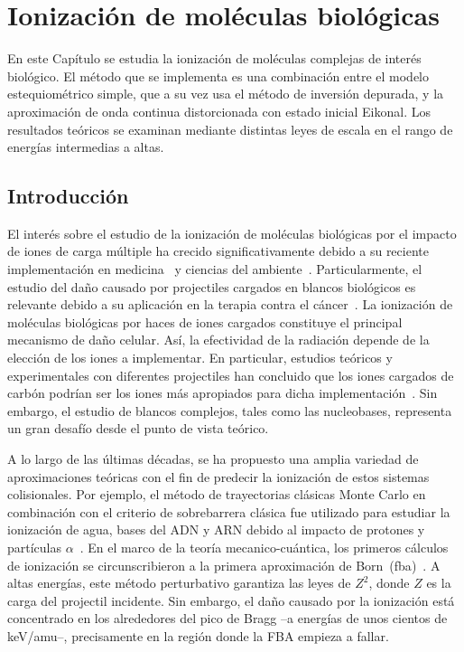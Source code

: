 \chapter{Ionización de moléculas biológicas}
\label{chap:ionmol}

En este Capítulo se estudia la ionización de moléculas complejas de 
interés biológico. El método que se implementa es una combinación entre 
el modelo estequiométrico simple, que a su vez usa el método de 
inversión depurada, y la aproximación de onda continua distorcionada con 
estado inicial Eikonal. Los resultados teóricos se examinan mediante 
distintas leyes de escala en el rango de energías intermedias a altas. 

\section{Introducción}

El interés sobre el estudio de la ionización de moléculas biológicas por 
el impacto de iones de carga múltiple ha crecido significativamente 
debido a su reciente implementación en medicina~\cite{Baskar:12,Solov:09} 
y ciencias del ambiente~\cite{Gafur:18,FerrazDias:13}. Particularmente, 
el estudio del daño causado por projectiles cargados en blancos 
biológicos es relevante debido a su aplicación en la terapia contra el 
cáncer~\cite{Baskar:12}. La ionización de moléculas biológicas por haces 
de iones cargados constituye el principal mecanismo de daño celular. 
Así, la efectividad de la radiación depende de la elección de los iones 
a implementar. En particular, estudios teóricos y experimentales con 
diferentes projectiles han concluido que los iones cargados de carbón 
podrían ser los iones más apropiados para dicha 
implementación~\cite{Mohamad:17}. Sin embargo, el estudio de blancos 
complejos, tales como las nucleobases, representa un gran desafío desde 
el punto de vista teórico. 

A lo largo de las últimas décadas, se ha propuesto una amplia variedad 
de aproximaciones teóricas con el fin de predecir la ionización de estos 
sistemas colisionales. Por ejemplo, el método de trayectorias clásicas 
Monte Carlo en combinación con el criterio de sobrebarrera clásica fue 
utilizado para estudiar la ionización de agua, bases del ADN y ARN 
debido al impacto de protones y partículas 
$\alpha$~\cite{Abbas:08,Lekadir:09}. 
En el marco de la teoría mecanico-cuántica, los primeros cálculos de 
ionización se circunscribieron a la primera aproximación de 
Born~(\acs{fba})~\cite{DalCappello:08,Champion:10}. A altas energías, 
este método perturbativo garantiza las leyes de $Z^2$, donde $Z$ es la 
carga del projectil incidente. Sin embargo, el daño causado por la 
ionización está concentrado en los alrededores del pico de Bragg --a 
energías de unos cientos de keV/amu--, precisamente en la región donde 
la FBA empieza a fallar. 

